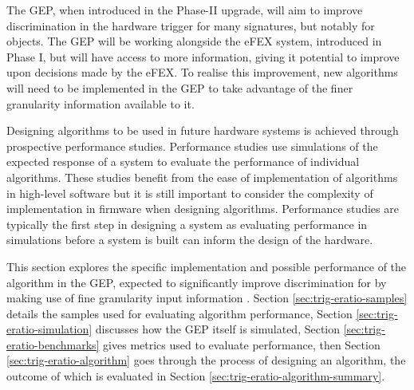 
The \ac{GEP}, when introduced in the Phase-II upgrade, will aim to improve
discrimination in the hardware trigger for many signatures, but notably for
\egamma objects. The \ac{GEP} will be working alongside the \ac{eFEX} system,
introduced in Phase I, but will have access to more information, giving it
potential to improve upon decisions made by the \ac{eFEX}. To realise this
improvement, new algorithms will need to be implemented in the \ac{GEP} to take
advantage of the finer granularity information available to it.

Designing algorithms to be used in future hardware systems is achieved through
prospective performance studies. Performance studies use simulations of the
expected response of a system to evaluate the performance of individual
algorithms. These studies benefit from the ease of implementation of algorithms
in high-level software but it is still important to consider the complexity of
implementation in firmware when designing algorithms. Performance studies are
typically the first step in designing a system as evaluating performance in
simulations before a system is built can inform the design of the hardware.

This section explores the specific implementation and possible performance of
the \eratio algorithm in the \ac{GEP}, expected to significantly improve
discrimination for \egamma by making use of fine granularity input information
\cite[p.~126]{ATLAS-TDR-TDAQ-PhaseII}.
%
Section \ref{sec:trig-eratio-samples} details the samples used for evaluating
algorithm performance, Section \ref{sec:trig-eratio-simulation} discusses how
the \ac{GEP} itself is simulated, Section \ref{sec:trig-eratio-benchmarks} gives
metrics used to evaluate performance, then Section
\ref{sec:trig-eratio-algorithm} goes through the process of designing an
algorithm, the outcome of which is evaluated in Section
\ref{sec:trig-eratio-algorithm-summary}.
